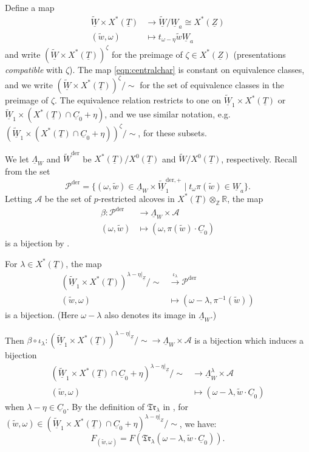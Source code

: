 \documentclass[oneside,a4paper,english, 11pt]{amsart}
\theoremstyle{plain}
\theoremstyle{plain}
\theoremstyle{plain}
\theoremstyle{plain}
\theoremstyle{plain}
\theoremstyle{plain}
\theoremstyle{definition}
\theoremstyle{definition}
\theoremstyle{definition}
\theoremstyle{remark}
\numberwithin{equation}{section}
\newcommand{\Z}{\mathbb{Z}}
\newcommand{\R}{\mathbb{R}}
\newcommand{\cA}{\mathcal{A}}
\newcommand{\cP}{\mathcal{P}}
\newcommand{\un}[1]{\underline{#1}}
\newcommand{\tld}[1]{\widetilde{#1}}
\newcommand{\der}{\mathrm{der}}
\begin{document}
%
Define a map
\begin{align}
\label{eqn:centralchar} \tld{\un{W}} \times X^*(\un{T}) &\longrightarrow \tld{\un{W}}/\un{W}_a \cong X^*(\un{Z}) \\
\nonumber (\tld{w},\omega) &\longmapsto t_{\omega-\eta} \tld{w} \un{W}_a
\end{align}
and write $(\tld{\un{W}} \times X^*(\un{T}))^\zeta$ for the preimage of $\zeta \in X^*(\un{Z})$ (presentations \emph{compatible} with $\zeta$). 
The map \eqref{eqn:centralchar} is constant on equivalence classes, and we write $(\tld{\un{W}} \times X^*(\un{T}))^\zeta/\sim$ for the set of equivalence classes in the preimage of $\zeta$. 
The equivalence relation restricts to one on $\tld{\un{W}}_1 \times X^*(\un{T})$ or $\tld{\un{W}}_1 \times (X^*(\un{T}) \cap \un{C}_0 + \eta)$, and we use similar notation, e.g.~$(\tld{\un{W}}_1 \times (X^*(\un{T}) \cap \un{C}_0 + \eta))^\zeta/\sim$, for these subsets. 

We let $\un{\Lambda}_W$ and $\tld{W}^{\der}$ be $X^*(\un{T})/X^0(\un{T})$ and $\tld{W}/X^0(\un{T})$, respectively. 
Recall from \cite[\S 2.1]{LLLM2} the set 
\[
\cP^{\der} = \{(\omega,\tld{w}) \in \un{\Lambda}_W \times \tld{\un{W}}_1^{\der,+} \mid t_\omega \pi(\tld{w}) \in \un{W}_a\}. 
\]
Letting $\cA$ be the set of $p$-restricted alcoves in $X^*(\un{T}) \otimes_{\Z} \R$, the map 
\begin{align*} 
 \beta: \cP^{\der} &\longrightarrow \un{\Lambda}_W \times \cA \\
(\omega,\tld{w}) &\longmapsto (\omega,\pi(\tld{w}) \cdot \un{C}_0)
\end{align*}
is a bijection by \cite[Lemma 2.1.1]{LLLM2}. 

For $\lambda \in X^*(\un{T})$, the map
\begin{align*}
(\tld{\un{W}}_1 \times X^*(\un{T}))^{\lambda-\eta|_{\un{Z}}}/\sim &\overset{\iota_\lambda}{\longrightarrow} \cP^{\der} \\
(\tld{w},\omega) &\longmapsto (\omega - \lambda,\pi^{-1}(\tld{w}))
\end{align*}  
is a bijection. 
(Here $\omega-\lambda$ also denotes its image in $\un{\Lambda}_W$.) 

Then $\beta \circ \iota_\lambda: (\tld{\un{W}}_1 \times X^*(\un{T}))^{\lambda-\eta|_{\un{Z}}}/\sim \longrightarrow \un{\Lambda}_W \times \cA$ is a bijection which induces a bijection 
\begin{align}
\label{eq:bij:SW} (\tld{\un{W}}_1 \times X^*(\un{T}) \cap \un{C}_0 + \eta)^{\lambda-\eta|_{\un{Z}}}/\sim &\longrightarrow \un{\Lambda}_W^\lambda \times \cA\\
\nonumber (\tld{w},\omega) &\longmapsto (\omega-\lambda,\tld{w} \cdot \un{C}_0)
\end{align}
when $\lambda -\eta \in\un{C}_0$. 
By the definition of $\mathfrak{Tr}_{\lambda}$ in \cite[\S 2.1]{LLLM2}, for $(\tld{w},\omega) \in (\tld{\un{W}}_1 \times X^*(\un{T}) \cap \un{C}_0 + \eta)^{\lambda-\eta|_{\un{Z}}}/\sim$, we have: 
\begin{equation}
\label{eq:SW:LAP}
F_{(\tld{w},\omega)} = F(\mathfrak{Tr}_{\lambda}(\omega-\lambda,\tld{w}\cdot \un{C}_0)).
\end{equation}  
%
\end{document}
